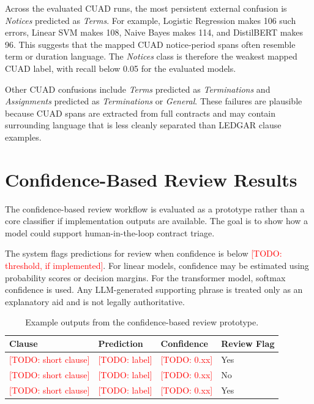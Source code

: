 \documentclass[11pt]{article}
\newcommand{\todo}[1]{\textcolor{red}{[TODO: #1]}}
\begin{document}
Across the evaluated CUAD runs, the most persistent external confusion is \textit{Notices} predicted as \textit{Terms}. For example, Logistic Regression makes 106 such errors, Linear SVM makes 108, Naive Bayes makes 114, and DistilBERT makes 96. This suggests that the mapped CUAD notice-period spans often resemble term or duration language. The \textit{Notices} class is therefore the weakest mapped CUAD label, with recall below 0.05 for the evaluated models.

Other CUAD confusions include \textit{Terms} predicted as \textit{Terminations} and \textit{Assignments} predicted as \textit{Terminations} or \textit{General}. These failures are plausible because CUAD spans are extracted from full contracts and may contain surrounding language that is less cleanly separated than LEDGAR clause examples.

\section{Confidence-Based Review Results}

The confidence-based review workflow is evaluated as a prototype rather than a core classifier if implementation outputs are available. The goal is to show how a model could support human-in-the-loop contract triage.

The system flags predictions for review when confidence is below \todo{threshold, if implemented}. For linear models, confidence may be estimated using probability scores or decision margins. For the transformer model, softmax confidence is used. Any LLM-generated supporting phrase is treated only as an explanatory aid and is not legally authoritative.

\begin{table}[t]
\centering
\small
\begin{tabular}{llll}
\toprule
\textbf{Clause} & \textbf{Prediction} & \textbf{Confidence} & \textbf{Review Flag} \\
\midrule
\todo{short clause} & \todo{label} & \todo{0.xx} & Yes \\
\todo{short clause} & \todo{label} & \todo{0.xx} & No \\
\todo{short clause} & \todo{label} & \todo{0.xx} & Yes \\
\bottomrule
\end{tabular}
\caption{Example outputs from the confidence-based review prototype.}
\label{tab:agentic-review}
\end{table}
\end{document}
